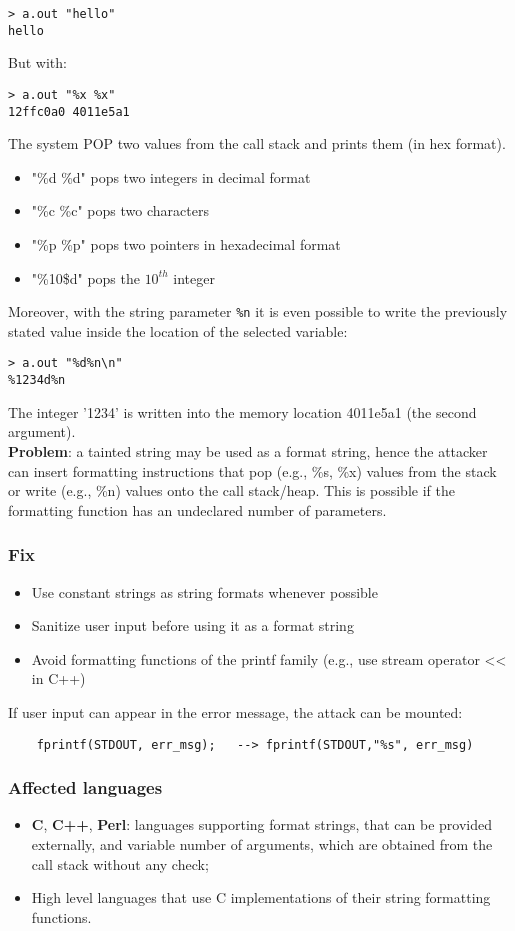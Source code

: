 \documentclass[a4paper, 10pt, titlepage]{article}
\begin{document}
\begin{verbatim}
> a.out "hello"
hello
\end{verbatim}
But with:
\begin{verbatim}
> a.out "%x %x"
12ffc0a0 4011e5a1
\end{verbatim}
The system POP two values from the call stack and prints them (in hex format).
\begin{itemize}
\item "\%d \%d" pops two integers in decimal format
\item "\%c \%c" pops two characters
\item "\%p \%p" pops two pointers in hexadecimal format
\item "\%10\$d" pops the $10^{th}$ integer
\end{itemize}
Moreover, with the string parameter \lstinline|%n| it is even possible to write the previously stated value inside the location of the selected variable:
\begin{verbatim}
> a.out "%d%n\n"
%1234d%n
\end{verbatim}
The integer '1234' is written into the memory location 4011e5a1 (the second argument). \medskip\\
\textbf{Problem}: a tainted string may be used as a format string, hence the attacker can insert formatting instructions that pop (e.g., \%s, \%x) values from the stack or write (e.g., \%n) values onto the call stack/heap. This is possible if the formatting function has an undeclared number of parameters. 

\subsubsection*{Fix}
\begin{itemize}
\item Use constant strings as string formats whenever possible
\item Sanitize user input before using it as a format string
\item Avoid formatting functions of the printf family (e.g., use stream operator << in C++)
\end{itemize}
If user input can appear in the error message, the attack can be
mounted:
\begin{lstlisting}
	fprintf(STDOUT, err_msg);	-->	fprintf(STDOUT,"%s", err_msg)
\end{lstlisting}

\subsubsection*{Affected languages}
\begin{itemize}
\item \textbf{C}, \textbf{C++}, \textbf{Perl}: languages supporting format strings, that can be provided externally, and variable number of arguments, which are obtained from the call stack without any check;
\item High level languages that use C implementations of their string
formatting functions.
\end{itemize}
\newpage
\end{document}
